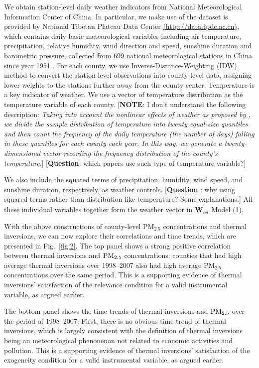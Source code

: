 \documentclass[12pt]{article}
\begin{document}
We obtain station-level daily weather indicators from National
Meteorological Information Center of China. In particular, we make use of
the dataset is provided by National Tibetan Plateau Data Center %
\url{(http://data.tpdc.ac.cn)}, which contains daily basic meteorological
variables including air temperature, precipitation, relative humidity, wind
direction and speed, sunshine duration and barometric pressure, collected
from 699 national meteorological stations in China since year 1951 %
\citep{Dailymeteorologicaldataset}. For each county, we use
Inverse-Distance-Weighting (IDW) method to convert the station-level
observations into county-level data, assigning lower weights to the stations
further away from the county center. Temperature is a key indicator of
weather. We use a vector of temperature distribution as the temperature
variable of each county. [\textbf{NOTE}: I don't understand the following
description: \emph{Taking into account the nonlinear effects of weather as
proposed by \citep{deschenes2017defensive}, we divide the sample
distribution of temperature into twenty equal-size quantiles and then count
the frequency of the daily temperature (the number of days) falling in these
quantiles for each county each year. In this way, we generate a
twenty-dimensional vector recording the frequency distribution of the
county's temperature}.] [\textbf{Question}: which papers use such type of
temperature variable?]

We also include the squared terms of precipitation, humidity, wind speed,
and sunshine duration, respectively, as weather controls. [\textbf{Question}%
: why using squared terms rather than distribution like temperature? Some
explanations.] All these individual variables together form the weather
vector in $\mathbf{W}_{ict}^{^{\prime }}$ Model (1).

With the above constructions of county-level $\mathrm{PM_{2.5}}$
concentrations and thermal inversions, we can now explore their correlations
and time trends, which are presented in Fig.~\ref{fig:2}. The top panel
shows a strong positive correlation between thermal inversions and $\mathrm{%
PM_{2.5}}$ concentrations: counties that had high average thermal inversions
over 1998--2007 also had high average $\mathrm{PM_{2.5}}$ concentrations
over the same period. This is a supporting evidence of thermal inversions'
satisfaction of the relevance condition for a valid instrumental variable,
as argued earlier. 

The bottom panel shows the time trends of thermal inversions and $\mathrm{%
PM_{2.5}}$ over the period of 1998--2007. First, there is no obvious time
trend of thermal inversions, which is largely consistent with the definition
of thermal inversions being an meteorological phenonenon not related to
economic activities and pollution. This is a supporting evidence of thermal
inversions' satisfaction of the exogeneity condition for a valid
instrumental variable, as argued earlier. 
\end{document}
